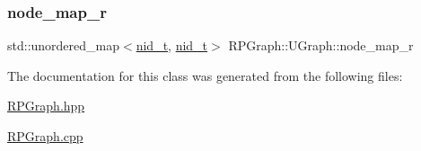 \subsubsection{\texorpdfstring{node\+\_\+map\+\_\+r}{node\_map\_r}}
{\footnotesize\ttfamily std\+::unordered\+\_\+map$<$\mbox{\hyperlink{namespaceRPGraph_ab3ae34f1ab88e48f43794c30c8697b74}{nid\+\_\+t}}, \mbox{\hyperlink{namespaceRPGraph_ab3ae34f1ab88e48f43794c30c8697b74}{nid\+\_\+t}}$>$ R\+P\+Graph\+::\+U\+Graph\+::node\+\_\+map\+\_\+r}



The documentation for this class was generated from the following files\+:\begin{DoxyCompactItemize}
\item 
\mbox{\hyperlink{RPGraph_8hpp}{R\+P\+Graph.\+hpp}}\item 
\mbox{\hyperlink{RPGraph_8cpp}{R\+P\+Graph.\+cpp}}\end{DoxyCompactItemize}
